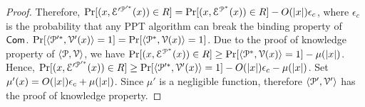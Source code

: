 \begin{proof}
	
	Therefore, 
	$\Pr[({x}, \mathcal{E}'^{\mathcal{P}'^\ast}({x})) \in R] = \Pr[({x}, \mathcal{E}^{\mathcal{P}^\ast}({x})) \in R] - O(|{x}|) \epsilon_c$, 
	where $\epsilon_c$ is the probability that any PPT algorithm can break the binding property of $\mathsf{Com}$.
	$\Pr[\langle \mathcal{P}'^\ast,\mathcal{V}'({x})\rangle = 1] = \Pr[\langle \mathcal{P}^\ast,\mathcal{V}({x})\rangle = 1]$.
	Due to the proof of knowledge property of $\langle \mathcal{P},\mathcal{V}\rangle$, we have 
	$\Pr[({x}, \mathcal{E}^{\mathcal{P}^\ast}({x})) \in R] \geq \Pr[\langle \mathcal{P}^\ast,\mathcal{V}({x})\rangle = 1] - \mu(|{x}|)$.
	Hence, 
	$\Pr[({x}, \mathcal{E}'^{\mathcal{P}'^\ast}({x})) \in R] \geq \Pr[\langle \mathcal{P}'^\ast,\mathcal{V}'({x})\rangle = 1] - O(|{x}|) \epsilon_c - \mu(|{x}|)$. Set $\mu'({x}) = O(|{x}|) \epsilon_c + \mu(|{x}|)$. Since $\mu'$ is a negligible function, therefore $\langle \mathcal{P}',\mathcal{V}'\rangle$ has the proof of knowledge property.
	

\end{proof}
